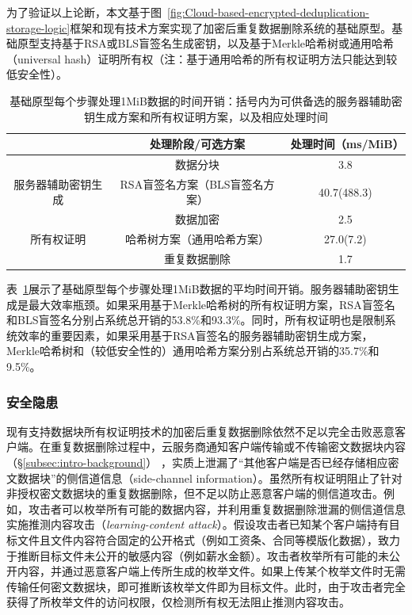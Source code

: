 为了验证以上论断，本文基于图~\ref{fig:Cloud-based-encrypted-deduplication-storage-logic}框架和现有技术方案实现了加密后重复数据删除系统的基础原型。基础原型支持基于RSA\cite{bellare2013DupLESS}或BLS\cite{armknecht2015transparent}盲签名生成密钥，以及基于Merkle哈希树\cite{halevi2011proofs}或通用哈希（universal hash）\cite{xu2013weak}证明所有权（注：基于通用哈希的所有权证明方法\cite{xu2013weak}只能达到较低安全性）。

\begin{table}[!htb]
    \small
    \centering
    \begin{tabular}{@{}ccc@{}}
    \toprule
                           & 处理阶段/可选方案          & 处理时间（ms/MiB） \\ \midrule
                           & 数据分块               & 3.8          \\
    服务器辅助密钥生成              & RSA盲签名方案（BLS盲签名方案） & 40.7(488.3)  \\
    \multirow{3}{*}{所有权证明} & 数据加密               & 2.5          \\
                           & 哈希树方案（通用哈希方案）      & 27.0(7.2)    \\
                           & 重复数据删除             & 1.7          \\ \bottomrule
    \end{tabular}
    \caption{基础原型每个步骤处理1MiB数据的时间开销：括号内为可供备选的服务器辅助密钥生成方案和所有权证明方案，以及相应处理时间}
    \label{tab:intro-bottleneck}
\end{table}

表~\ref{tab:intro-bottleneck}展示了基础原型每个步骤处理1MiB数据的平均时间开销。服务器辅助密钥生成是最大效率瓶颈。如果采用基于Merkle哈希树的所有权证明方案，RSA盲签名和BLS盲签名分别占系统总开销的53.8\%和93.3\%。同时，所有权证明也是限制系统效率的重要因素，如果采用基于RSA盲签名的服务器辅助密钥生成方案，Merkle哈希树和（较低安全性的）通用哈希方案分别占系统总开销的35.7\%和9.5\%。

\subsubsection{安全隐患} 
\label{subsubsec:intro-problem-security}

现有支持数据块所有权证明技术的加密后重复数据删除依然不足以完全击败恶意客户端。在重复数据删除过程中，云服务商通知客户端传输或不传输密文数据块内容（\S\ref{subsec:intro-background}） ，实质上泄漏了“其他客户端是否已经存储相应密文数据块”的侧信道信息（side-channel information）。虽然所有权证明阻止了针对非授权密文数据块的重复数据删除，但不足以防止恶意客户端的侧信道攻击。例如，攻击者可以枚举所有可能的数据内容，并利用重复数据删除泄漏的侧信道信息实施推测内容攻击（{\em learning-content attack}）\cite{harnik2010side,zuo2018mitigating}。假设攻击者已知某个客户端持有目标文件且文件内容符合固定的公开格式（例如工资条、合同等模版化数据），致力于推断目标文件未公开的敏感内容（例如薪水金额）。攻击者枚举所有可能的未公开内容，并通过恶意客户端上传所生成的枚举文件。如果上传某个枚举文件时无需传输任何密文数据块，即可推断该枚举文件即为目标文件。此时，由于攻击者完全获得了所枚举文件的访问权限，仅检测所有权无法阻止推测内容攻击。

